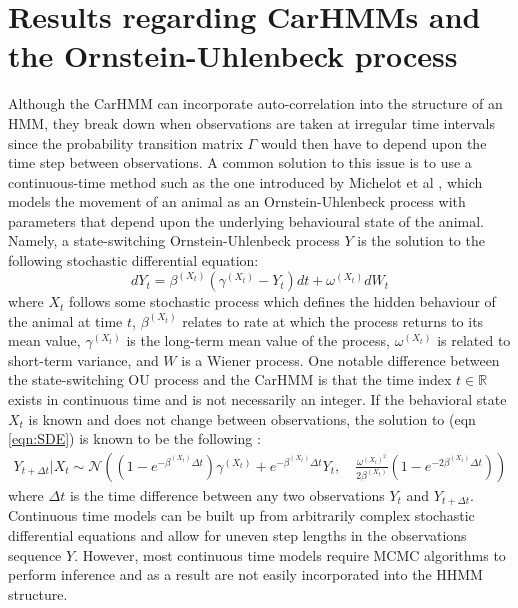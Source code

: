 
\section{Results regarding CarHMMs and the Ornstein-Uhlenbeck process}


Although the CarHMM can incorporate auto-correlation into the structure of an HMM, they break down when observations are taken at irregular time intervals since the probability transition matrix $\Gamma$ would then have to depend upon the time step between observations. A common solution to this issue is to use a continuous-time method such as the one introduced by Michelot et al \citep{Michelot:2019}, which models the movement of an animal as an Ornstein-Uhlenbeck process with parameters that depend upon the underlying behavioural state of the animal. Namely, a state-switching Ornstein-Uhlenbeck process $Y$ is the solution to the following stochastic differential equation:
%
\begin{equation}
    \label{eqn:SDE}
    dY_t = \beta^{(X_t)}(\gamma^{(X_t)} - Y_t)dt + \omega^{(X_t)} dW_t
\end{equation}
%
where $X_t$ follows some stochastic process which defines the hidden behaviour of the animal at time $t$, $\beta^{(X_t)}$ relates to rate at which the process returns to its mean value, $\gamma^{(X_t)}$ is the long-term mean value of the process, $\omega^{(X_t)}$ is related to short-term variance, and $W$ is a Wiener process. One notable difference between the state-switching OU process and the CarHMM is that the time index $t \in \mathbb{R}$ exists in continuous time and is not necessarily an integer. If the behavioral state $X_t$ is known and does not change between observations, the solution to (eqn \ref{eqn:SDE}) is known to be the following \citep{Michelot:2019}:
%
\begin{align}
Y_{t+\Delta t} | X_{t} \sim \mathcal{N}\left((1-e^{-\beta^{(X_t)}\Delta t})\gamma^{(X_t)} + e^{-\beta^{(X_t)}\Delta t} Y_t,\quad \frac{\omega^{(X_t)^2}}{2\beta^{(X_t)}} (1-e^{-2\beta^{(X_t)}\Delta t})\right)
\label{eqn:OU_sol}
\end{align}
%
where $\Delta t$ is the time difference between any two observations $Y_t$ and $Y_{t+\Delta t}$. Continuous time models can be built up from arbitrarily complex stochastic differential equations and allow for uneven step lengths in the observations sequence $Y$. However, most continuous time models require MCMC algorithms to perform inference and as a result are not easily incorporated into the HHMM structure.

